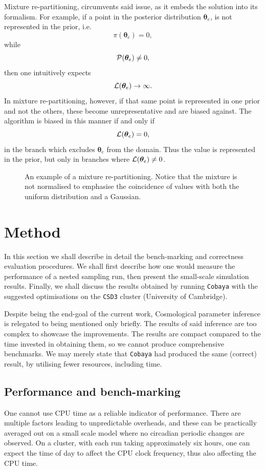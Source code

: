 \documentclass[usenatbib]{mnras}
\begin{document}
Mixture re-partitioning, circumvents said issue, as it embeds the
solution into its formalism. For example, if a point in the
posterior distribution \(\bm{\theta}_{e}\), is not represented in
the prior, i.e.  \[\pi(\bm{\theta}_{e}) = 0,\] while \[{\cal
	P}(\bm{\theta}_{e}) \ne 0,\] then one intuitively expects \[{\cal
	L}(\bm{\theta}_{e}) \rightarrow \infty.\] In mixture
re-partitioning, however, if that same point is represented in one
prior and not the others, these become unrepresentative and are
biased against. The algorithm is biased in this manner if and only
if \[{\cal L}(\bm{\theta}_{e}) = 0,\] in the branch which excludes
\(\bm{\theta}_{e}\) from the domain. Thus the value is represented
in the prior, but only in branches where \({\cal
	L}(\bm{\theta}_{e}) \ne 0\).

\begin{figure}
 
\caption{An example of a mixture re-partitioning. Notice that the mixture is not normalised to emphasise the coincidence of values with both the uniform distribution and a Gaussian.\label{fig:mixture}}
\end{figure}



\section{Method}\label{sec:org3b115ae}
In this section we shall describe in detail the bench-marking and
correctness evaluation procedures. We shall first describe how one
would measure the performance of a nested sampling run, then present
the small-scale simulation results. Finally, we shall discuss the
results obtained by running \texttt{Cobaya} with the suggested
optimisations on the \texttt{CSD3} cluster (University of Cambridge).

Despite being the end-goal of the current work, Cosmological
parameter inference is relegated to being mentioned only
briefly. The results of said inference are too complex to showcase
the improvements. The results are compact compared to the time
invested in obtaining them, so we cannot produce comprehensive
benchmarks. We may merely state that \texttt{Cobaya} had produced the same
(correct) result, by utilising fewer resources, including time.


\subsection{Performance and bench-marking}\label{sec:orgf6a90a2}
One cannot use CPU time as a reliable indicator of
performance. There are multiple factors leading to unpredictable
overheads, and these can be practically averaged out on a small
scale model where no circadian periodic changes are observed. On a
cluster, with each run taking approximately six hours, one can
expect the time of day to affect the CPU clock frequency, thus also
affecting the CPU time.
\end{document}
